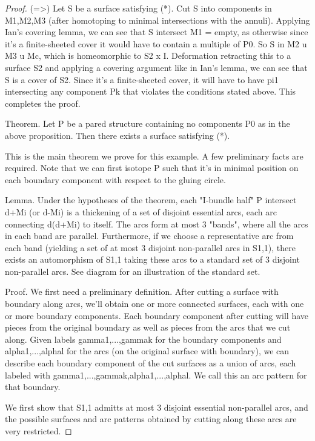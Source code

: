 \documentclass[12pt]{amsart}
\theoremstyle{definition}
\begin{document}
\begin{proof}
(=>) Let S be a surface satisfying (*). Cut S into components in M1,M2,M3
(after homotoping to minimal intersections with the annuli). Applying Ian's
covering lemma, we can see that S intersect M1 = empty, as otherwise since it's
a finite-sheeted cover it would have to contain a multiple of P0.
So S in M2 u M3 u Mc, which is homeomorphic to S2 x I. Deformation retracting
this to a surface S2 and applying a covering argument like in Ian's lemma, we
can see that S is a cover of S2. Since it's a finite-sheeted cover, it will
have to have pi1 intersecting any component Pk that violates the conditions
stated above. This completes the proof.

Theorem. Let P be a pared structure containing no components P0 as in the above
proposition. Then there exists a surface satisfying (*).

This is the main theorem we prove for this example. A few preliminary facts are
required. Note that we can first isotope P such that it's in minimal position
on each boundary component with respect to the gluing circle.

Lemma. Under the hypotheses of the theorem, each "I-bundle half" P intersect
d+Mi (or d-Mi) is a thickening of a set of disjoint essential arcs, each arc
connecting d(d+Mi) to itself. The arcs form at most 3 "bands", where all the
arcs in each band are parallel.  Furthermore, if we choose a representative arc
from each band (yielding a set of at most 3 disjoint non-parallel arcs in
S1,1), there exists an automorphism of S1,1 taking these arcs to a standard set
of 3 disjoint non-parallel arcs.  See diagram for an illustration of the
standard set.

Proof. We first need a preliminary definition. After cutting a surface with
boundary along arcs, we'll obtain one or more connected surfaces, each with one
or more boundary components. Each boundary component after cutting will have
pieces from the original boundary as well as pieces from the arcs that we cut
along. Given labels gamma1,...,gammak for the boundary components and
alpha1,...,alphal for the arcs (on the original surface with boundary), we can
describe each boundary component of the cut surfaces as a union of arcs, each
labeled with gamma1,...,gammak,alpha1,...,alphal. We call this an arc pattern
for that boundary.

We first show that S1,1 admitts at most 3 disjoint essential non-parallel arcs,
and the possible surfaces and arc patterns obtained by cutting along these arcs
are very restricted.


\end{proof}
\end{document}
